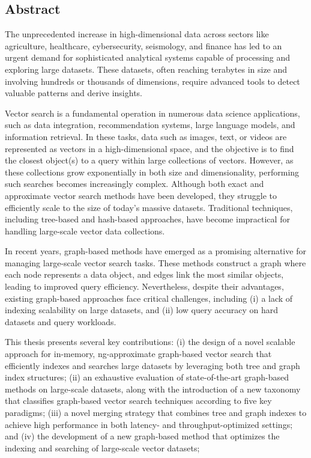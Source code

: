 \documentclass[12pt]{thesis}
\newenvironment{abstractenglish}{
    \selectlanguage{english}
    \chapter*{Abstract}
}{
}
\begin{document}
\begin{preliminary}



\clearpage


\begin{abstractenglish}
The unprecedented increase in high-dimensional data across sectors like agriculture, healthcare, cybersecurity, seismology, and finance has led to an urgent demand for sophisticated analytical systems capable of processing and exploring large datasets. These datasets, often reaching terabytes in size and involving hundreds or thousands of dimensions, require advanced tools to detect valuable patterns and derive insights.

Vector search is a fundamental operation in numerous data science applications, such as data integration, recommendation systems, large language models, and information retrieval. In these tasks, data such as images, text, or videos are represented as vectors in a high-dimensional space, and the objective is to find the closest object(s) to a query within large collections of vectors. However, as these collections grow exponentially in both size and dimensionality, performing such searches becomes increasingly complex. Although both exact and approximate vector search methods have been developed, they struggle to efficiently scale to the size of today's massive datasets. Traditional techniques, including tree-based and hash-based approaches, have become impractical for handling large-scale vector data collections.

In recent years, graph-based methods have emerged as a promising alternative for managing large-scale vector search tasks. These methods construct a graph where each node represents a data object, and edges link the most similar objects, leading to improved query efficiency. Nevertheless, despite their advantages, existing graph-based approaches face critical challenges, including (i) a lack of indexing scalability on large datasets, and (ii) low query accuracy on hard datasets and query workloads.


This thesis presents several key contributions: (i) the design of a novel scalable approach for in-memory, ng-approximate graph-based vector search that efficiently indexes and searches large datasets by leveraging both tree and graph index structures; (ii) an exhaustive evaluation of state-of-the-art graph-based methods on large-scale datasets, along with the introduction of a new taxonomy that classifies graph-based vector search techniques according to five key paradigms; (iii) a novel merging strategy that combines tree and graph indexes to achieve high performance in both latency- and throughput-optimized settings; and (iv) the development of a new graph-based method that optimizes the indexing and searching of large-scale vector datasets; 


\end{abstractenglish}
\end{preliminary}
\end{document}

